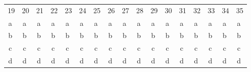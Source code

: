 \documentclass[letterpaper,10pt]{article}
\begin{document}
\begin{center}
\begin{tabular}{ccccccccccccccccc}
19 & 20 & 21 & 22 & 23 & 24 & 25 & 26 & 27 & 28 & 29 & 30 & 31 & 32 & 33 & 34 & 35\\
\textcircled{a} & \textcircled{a} & \textcircled{a} & \textcircled{a} & \textcircled{a} & \textcircled{a} & \textcircled{a} & \textcircled{a} & \textcircled{a} & \textcircled{a} & \textcircled{a} & \textcircled{a} & \textcircled{a} & \textcircled{a} & \textcircled{a} & \textcircled{a} & \textcircled{a}\\
\textcircled{b} & \textcircled{b} & \textcircled{b} & \textcircled{b} & \textcircled{b} & \textcircled{b} & \textcircled{b} & \textcircled{b} & \textcircled{b} & \textcircled{b} & \textcircled{b} & \textcircled{b} & \textcircled{b} & \textcircled{b} & \textcircled{b} & \textcircled{b} & \textcircled{b}\\
\textcircled{c} & \textcircled{c} & \textcircled{c} & \textcircled{c} & \textcircled{c} & \textcircled{c} & \textcircled{c} & \textcircled{c} & \textcircled{c} & \textcircled{c} & \textcircled{c} & \textcircled{c} & \textcircled{c} & \textcircled{c} & \textcircled{c} & \textcircled{c} & \textcircled{c}\\
\textcircled{d} & \textcircled{d}& \textcircled{d} & \textcircled{d} & \textcircled{d} & \textcircled{d} & \textcircled{d} & \textcircled{d} & \textcircled{d} & \textcircled{d} & \textcircled{d} & \textcircled{d} & \textcircled{d} & \textcircled{d} & \textcircled{d} & \textcircled{d} & \textcircled{d}\\
\end{tabular}
\end{center}
\vspace*{.6cm}
\dotfill
\vspace*{.6cm}
\end{document}
